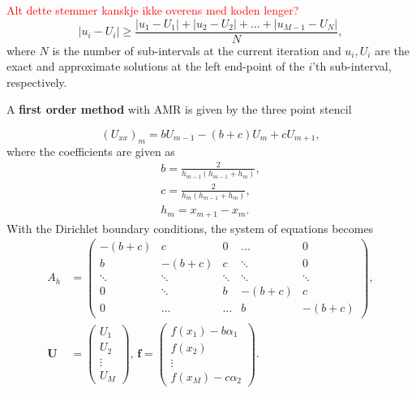 \textcolor{red}{Alt dette stemmer kanskje ikke overens med koden lenger?}
\begin{equation*}
    |u_i - U_i| \geq \frac{|u_1-U_1| + |u_2-U_2| + \dots + |u_{M-1} - U_N|}{N},
\end{equation*}
where $N$ is the number of sub-intervals at the current iteration and $u_i, U_i$ are the exact and approximate solutions at the left end-point of the $i$'th sub-interval, respectively.

A \textbf{first order method} with AMR is given by the three point stencil \cite{Liu}

\begin{equation*}
    (U_{xx})_m = bU_{m-1} - (b+c)U_{m} + cU_{m+1},
\end{equation*}
where the coefficients are given as 
\begin{equation*}
\begin{split}
    b = \frac{2}{h_{m-1}(h_{m-1}+h_{m})}, \\
    c = \frac{2}{h_{m}(h_{m-1}+h_{m})}, \\
    h_m = x_{m+1} - x_m.
\end{split}
\end{equation*}
With the Dirichlet boundary conditions, the system of equations becomes
\begin{equation*}
\begin{split}
    A_h &= \begin{pmatrix} 
    -(b+c) & c & 0 & \dots & 0 \\
    b & -(b+c) & c & \ddots & 0 \\
    \ddots & \ddots & \ddots & \ddots & \ddots \\
    0 & \ddots & b & -(b+c) & c \\
    0 & \dots & \dots & b & -(b+c)
    \end{pmatrix}, \\ 
    \boldsymbol{U} &= \begin{pmatrix}
    U_1 \\
    U_2 \\
    \vdots \\
    U_M 
    \end{pmatrix}, \, \boldsymbol{f} = \begin{pmatrix}
    f(x_1) - b\alpha_1 \\
    f(x_2) \\
    \vdots \\
    f(x_M) - c\alpha_2
    \end{pmatrix}.
\end{split}
\end{equation*}

